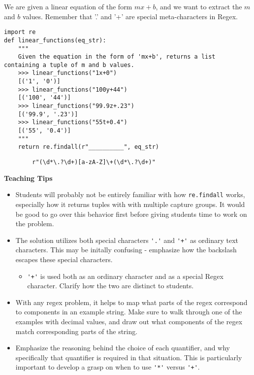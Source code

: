 \begin{blocksection}
\question We are given a linear equation of the form $mx+b$, and we want to extract the $m$ and $b$ values. Remember that '.' and '+' are special meta-characters in Regex.

\begin{lstlisting}
import re
def linear_functions(eq_str):
    """
    Given the equation in the form of 'mx+b', returns a list containing a tuple of m and b values.
    >>> linear_functions("1x+0")
    [('1', '0')]
    >>> linear_functions("100y+44")
    [('100', '44')]
    >>> linear_functions("99.9z+.23")
    [('99.9', '.23')]
    >>> linear_functions("55t+0.4")
    [('55', '0.4')]
    """
    return re.findall(r"__________", eq_str)
\end{lstlisting}

\begin{solution}[2in]
    \begin{lstlisting}
        r"(\d*\.?\d+)[a-zA-Z]\+(\d*\.?\d+)"
    \end{lstlisting}
\end{solution}
\end{blocksection}

\begin{guide}
\begin{blocksection}
\textbf{Teaching Tips}
    \begin{itemize}
        \item Students will probably not be entirely familiar with how \lstinline{re.findall} works, especially how it returns tuples with with multiple capture groups. It would be good to go over this behavior first before giving students time to work on the problem.
        \item The solution utilizes both special characters \lstinline$'.'$ and \lstinline$'+'$ as ordinary text characters. This may be initally confusing - emphasize how the backslash escapes these special characters.
        \begin{itemize}
            \item \lstinline$'+'$ is used both as an ordinary character and as a special Regex character. Clarify how the two are distinct to students.
        \end{itemize}
        \item With any regex problem, it helps to map what parts of the regex correspond to components in an example string. Make sure to walk through one of the examples with decimal values, and draw out what components of the regex match corresponding parts of the string.
        \item Emphasize the reasoning behind the choice of each quantifier, and why specifically that quantifier is required in that situation. This is particularly important to develop a grasp on when to use \lstinline$'*'$ versus \lstinline$'+'$.
    \end{itemize}
\end{blocksection}
\end{guide}
    